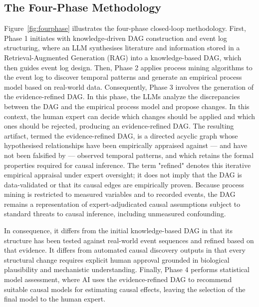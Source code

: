 \documentclass[sn-vancouver-num]{sn-jnl}
\begin{document}
\subsection{The Four-Phase Methodology}
Figure~\ref{fig:fourphase} illustrates the four-phase closed-loop methodology. First, Phase 1 initiates with knowledge-driven DAG construction and event log structuring, where an LLM synthesises literature and information stored in a Retrieval-Augmented Generation (RAG) into a knowledge-based DAG, which then guides event log design. Then, Phase 2 applies process mining algorithms to the event log to discover temporal patterns and generate an empirical process model based on real-world data. Consequently, Phase 3 involves the generation of the evidence-refined DAG. In this phase, the LLMs analyze the discrepancies between the DAG and the empirical process model and propose changes. In this context, the human expert can decide which changes should be applied and which ones should be rejected, producing an evidence-refined DAG. The resulting artifact, termed the evidence-refined DAG, is a directed acyclic graph whose hypothesised relationships have been empirically appraised against — and have not been falsified by — observed temporal patterns, and which retains the formal properties required for causal inference. The term "refined" denotes this iterative empirical appraisal under expert oversight; it does not imply that the DAG is data-validated or that its causal edges are empirically proven. Because process mining is restricted to measured variables and to recorded events, the DAG remains a representation of expert-adjudicated causal assumptions subject to standard threats to causal inference, including unmeasured confounding. 

In consequence, it differs from the initial knowledge-based DAG in that its structure has been tested against real-world event sequences and refined based on that evidence. It differs from automated causal discovery outputs in that every structural change requires explicit human approval grounded in biological plausibility and mechanistic understanding. Finally, Phase 4 performs statistical model assessment, where AI uses the evidence-refined DAG to recommend suitable causal models for estimating causal effects, leaving the selection of the final model to the human expert.
\end{document}

